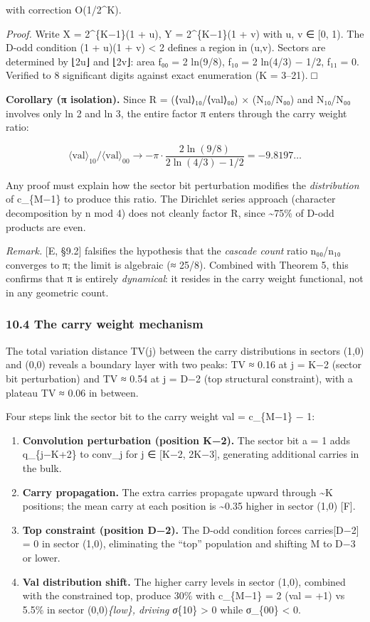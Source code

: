 \documentclass[
  11pt,
]{article}
\begin{document}
with correction O(1/2\^{}K).

\emph{Proof.} Write X = 2\^{}\{K−1\}(1 + u), Y = 2\^{}\{K−1\}(1 + v) with u, v ∈
{[}0, 1). The D-odd condition (1 + u)(1 + v) \textless{} 2 defines a region in
(u,v). Sectors are determined by ⌊2u⌋ and ⌊2v⌋: area f₀₀ = 2 ln(9/8), f₁₀ = 2
ln(4/3) − 1/2, f₁₁ = 0. Verified to 8 significant digits against exact
enumeration (K = 3--21). □

\textbf{Corollary (π isolation).} Since R = (⟨val⟩₁₀/⟨val⟩₀₀) × (N₁₀/N₀₀) and
N₁₀/N₀₀ involves only ln 2 and ln 3, the entire factor π enters through the
carry weight ratio:

\[\langle\text{val}\rangle_{10}/\langle\text{val}\rangle_{00} \to -\pi \cdot \frac{2\ln(9/8)}{2\ln(4/3) - 1/2} = -9.8197\ldots\]

Any proof must explain how the sector bit perturbation modifies the
\emph{distribution} of c\_\{M−1\} to produce this ratio. The Dirichlet series
approach (character decomposition by n mod 4) does not cleanly factor R, since
\textasciitilde75\% of D-odd products are even.

\emph{Remark.} {[}E, §9.2{]} falsifies the hypothesis that the \emph{cascade
count} ratio n₀₀/n₁₀ converges to π; the limit is algebraic (≈ 25/8). Combined
with Theorem 5, this confirms that π is entirely \emph{dynamical}: it resides in
the carry weight functional, not in any geometric count.

\subsubsection{10.4 The carry weight
mechanism}\label{the-carry-weight-mechanism}

The total variation distance TV(j) between the carry distributions in sectors
(1,0) and (0,0) reveals a boundary layer with two peaks: TV ≈ 0.16 at j = K−2
(sector bit perturbation) and TV ≈ 0.54 at j = D−2 (top structural constraint),
with a plateau TV ≈ 0.06 in between.

Four steps link the sector bit to the carry weight val = c\_\{M−1\} − 1:

\begin{enumerate}
\def\labelenumi{\arabic{enumi}.}
\item
  \textbf{Convolution perturbation (position K−2).} The sector bit a = 1 adds
  q\_\{j−K+2\} to conv\_j for j ∈ {[}K−2, 2K−3{]}, generating additional carries
  in the bulk.
\item
  \textbf{Carry propagation.} The extra carries propagate upward through
  \textasciitilde K positions; the mean carry at each position is
  \textasciitilde0.35 higher in sector (1,0) {[}F{]}.
\item
  \textbf{Top constraint (position D−2).} The D-odd condition forces
  carries{[}D−2{]} = 0 in sector (1,0), eliminating the ``top'' population and
  shifting M to D−3 or lower.
\item
  \textbf{Val distribution shift.} The higher carry levels in sector (1,0),
  combined with the constrained top, produce 30\% with c\_\{M−1\} = 2 (val = +1)
  vs 5.5\% in sector (0,0)\emph{\{low\}, driving σ}\{10\} \textgreater{} 0 while
  σ\_\{00\} \textless{} 0.
\end{enumerate}
\end{document}
